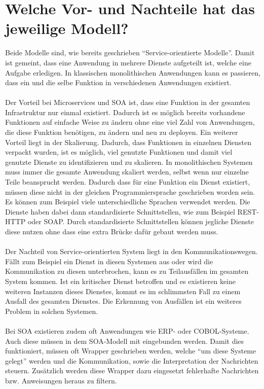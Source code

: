 \section{Welche Vor- und Nachteile hat das jeweilige Modell?}
\label{sec:VorNachteile}
Beide Modelle sind, wie bereits geschrieben "`Service-orientierte Modelle"'. Damit ist gemeint, dass eine Anwendung in mehrere Dienste aufgeteilt ist, welche eine Aufgabe erledigen. In klassischen monolithischen Anwendungen kann es passieren, dass ein und die selbe Funktion in verschiedenen Anwendungen existiert.
\\\\
Der Vorteil bei Microservices und SOA ist, dass eine Funktion in der gesamten Infrastruktur nur einmal existiert. Dadurch ist es möglich bereits vorhandene Funktionen auf einfache Weise zu ändern ohne eine viel Zahl von Anwendungen, die diese Funktion benötigen, zu ändern und neu zu deployen.
Ein weiterer Vorteil liegt in der Skalierung. Dadurch, dass Funktionen in einzelnen Diensten verpackt wurden, ist es möglich, viel genutzte Funktionen und damit viel genutzte Dienste zu identifizieren und zu skalieren. In monolithischen Systemen muss immer die gesamte Anwendung skaliert werden, selbst wenn nur einzelne Teile beansprucht werden.
Dadurch dass für eine Funktion ein Dienst existiert, müssen diese nicht in der gleichen Programmiersprache geschrieben worden sein. Es können zum Beispiel viele unterschiedliche Sprachen verwendet werden. Die Dienste haben dabei dann standardisierte Schnittstellen, wie zum Beispiel REST-HTTP oder SOAP. Durch standardisierte Schnittstellen können jegliche Dienste diese nutzen ohne dass eine extra Brücke dafür gebaut werden muss.
\\\\
Der Nachteil von Service-orientierten System liegt in den Kommunikationswegen. Fällt zum Beispiel ein Dienst in diesen Systemen aus oder wird die Kommunikation zu diesen unterbrochen, kann es zu Teilausfällen im gesamten System kommen. Ist ein kritischer Dienst betroffen und es existieren keine weiteren Instanzen dieses Dienstes, kommt es im schlimmsten Fall zu einem Ausfall des gesamten Dienstes. Die Erkennung von Ausfällen ist ein weiteres Problem in solchen Systemen.
\\\\
Bei SOA existieren zudem oft Anwendungen wie ERP- oder COBOL-Systeme. Auch diese müssen in dem SOA-Modell mit eingebunden werden. Damit dies funktioniert, müssen oft Wrapper geschrieben werden, welche "`um diese Systeme gelegt"' werden und die Kommunikation, sowie die Interpretation der Nachrichten steuern. Zusätzlich werden diese Wrapper dazu eingesetzt fehlerhafte Nachrichten bzw. Anweisungen heraus zu filtern.

